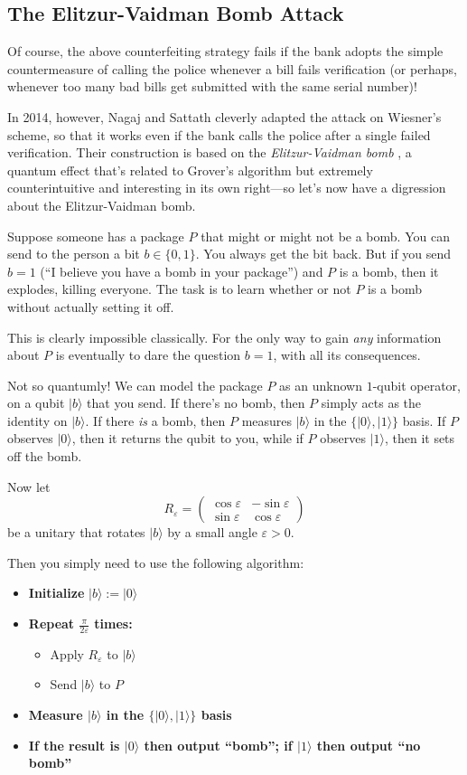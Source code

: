 \documentclass[11pt]{report}
\theoremstyle{plain}
\theoremstyle{definition}
\newcommand{\eps}{\varepsilon}
\renewcommand{\ket}[1]{|#1\rangle}
\begin{document}
\subsection{The Elitzur-Vaidman Bomb Attack}

Of course, the above counterfeiting strategy fails if the bank adopts the simple countermeasure of calling the police whenever a bill fails verification (or perhaps, whenever too many bad bills get submitted with the same serial number)!

In 2014, however, Nagaj and Sattath \cite{NS14} cleverly adapted the attack on Wiesner's scheme, so that it works even if the bank calls the police after a single failed verification.  Their construction is based on the {\em Elitzur-Vaidman bomb} \cite{EV93}, a quantum effect that's related to Grover's algorithm but extremely counterintuitive and interesting in its own right---so let's now have a digression about the Elitzur-Vaidman bomb.

Suppose someone has a package $P$ that might or might not be a bomb. You can send to the person a bit $b\in\{0,1\}$. You always get the bit back. But if you send $b=1$ (``I believe you have a bomb in your package'') and $P$ is a bomb, then it explodes, killing everyone. The task is to learn whether or not $P$ is a bomb without actually setting it off.

This is clearly impossible classically.  For the only way to gain {\em any} information about $P$ is eventually to dare the question $b=1$, with all its consequences.

Not so quantumly!  We can model the package $P$ as an unknown $1$-qubit operator, on a qubit $\ket{b}$ that you send.  If there's no bomb, then $P$ simply acts as the identity on $\ket{b}$.  If there {\em is} a bomb, then $P$ measures $\ket{b}$ in the $\{\ket{0},\ket{1} \}$ basis.  If $P$ observes $\ket{0}$, then it returns the qubit to you, while if $P$ observes $\ket{1}$, then it sets off the bomb.

Now let
$$
R_\eps = \begin{pmatrix}\cos\eps & -\sin\eps\\ \sin\eps & \cos\eps\end{pmatrix}
$$
be a unitary that rotates $\ket{b}$ by a small angle $\eps > 0$.

Then you simply need to use the following algorithm:

\begin{itemize}
\item \textbf{Initialize} $\ket{b} := \ket{0}$
\item \textbf{Repeat $\frac{\pi}{2 \eps}$ times:}
\begin{itemize}
\item Apply $R_\eps$ to $\ket{b}$
\item Send $\ket{b}$ to $P$
\end{itemize}
\item \textbf{Measure $\ket{b}$ in the $\{\ket{0},\ket{1} \}$ basis}
\item \textbf{If the result is $\ket{0}$ then output ``bomb''; if $\ket{1}$ then output ``no bomb''}
\end{itemize}
\end{document}
